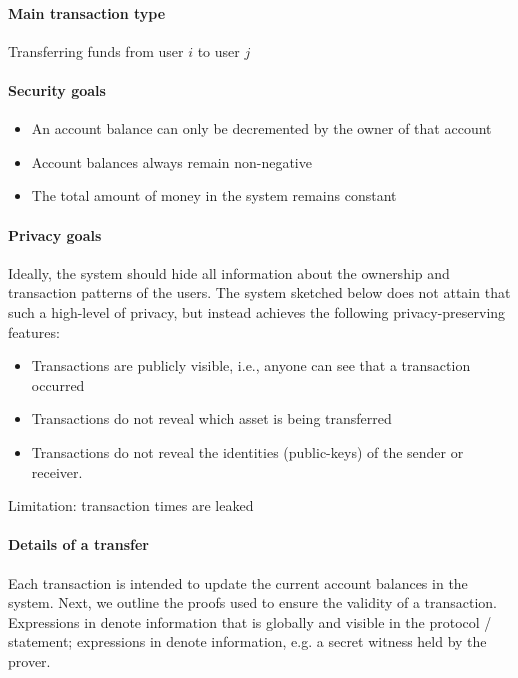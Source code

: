 \paragraph[:]{Main transaction type} 
Transferring funds from user $i$ to user $j$

\paragraph[:]{Security goals}
    \begin{itemize}
		\item An account balance can only be decremented by the owner of that account
    \item Account balances always remain non-negative
    \item The total amount of money in the system remains constant
		\end{itemize}

\paragraph[:]{Privacy goals}
Ideally, the system should hide all information about the ownership and transaction patterns of the users.
The system sketched below does not attain that such a high-level of privacy, but instead achieves the following privacy-preserving features:
\begin{itemize}
	\item Transactions are publicly visible, i.e., anyone can see that a transaction occurred
    \item Transactions do not reveal which asset is being transferred
    \item Transactions do not reveal the identities (public-keys) of the sender or receiver.
\end{itemize}

Limitation: transaction times are leaked


\paragraph[:]{Details of a transfer}
Each transaction is intended to update the current account balances in the system.
Next, we outline the proofs used to ensure the validity of a transaction.
Expressions in  denote information that is globally and  visible in the protocol / statement;
expressions in  denote  information, e.g. a secret witness held by the prover.


